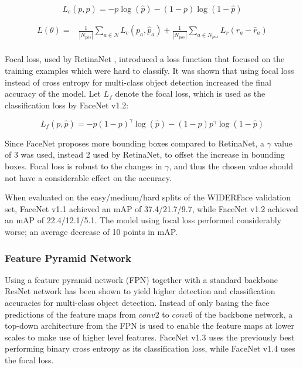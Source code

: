 \documentclass[a4paper, twoside]{article}
\begin{document}
\begin{equation}
L_c(p, \hat{p}) = -p \log{(\hat{p})} -(1-p) \log{(1-\hat{p})}
\end{equation}

\begin{equation}
\begin{split}
	L(\theta) = &  \frac{1}{|N_{pos}|} \sum_{a \in N} L_c(p_a, \hat{p}_a) 
	 + \frac{1}{|N_{pos}|} \sum_{a \in N_{pos}} L_r(r_a - \hat{r}_a)  \\ 
\end{split}
\end{equation}

Focal loss, used by RetinaNet \cite{retinanet}, introduced a loss function that focused on the training examples which were hard to classify. It was shown that using focal loss instead of cross entropy for multi-class object detection increased the final accuracy of the model. Let $L_f$ denote the focal loss, which is used as the classification loss by FaceNet v1.2:

\begin{equation}
L_f(p, \hat{p}) = -p (1-p)^\gamma \log{(\hat{p})} -(1-p) p^\gamma\log{(1-\hat{p})}
\end{equation}

Since FaceNet proposes more bounding boxes compared to RetinaNet, a $\gamma$ value of 3 was used, instead 2 used by RetinaNet, to offset the increase in bounding boxes. Focal loss is robust to the changes in $\gamma$, and thus the chosen value should not have a considerable effect on the accuracy.

When evaluated on the easy/medium/hard splits of the WIDERFace validation set, FaceNet v1.1 achieved an mAP of 37.4/21.7/9.7, while FaceNet v1.2 achieved an mAP of 22.4/12.1/5.1. The model using focal loss performed considerably worse; an average decrease of 10 points in mAP.

\subsubsection{Feature Pyramid Network}
Using a feature pyramid network (FPN) together with a standard backbone ResNet network has been shown to yield higher detection and classification accuracies \cite{fpn} \cite{retinanet} for multi-class object detection. Instead of only basing the face predictions of the feature maps from $conv2$ to $conv6$ of the backbone network, a top-down architecture from the FPN is used to enable the feature maps at lower scales to make use of higher level features. FaceNet v1.3 uses the previously best performing binary cross entropy as its classification loss, while FaceNet v1.4 uses the focal loss.
\end{document}
